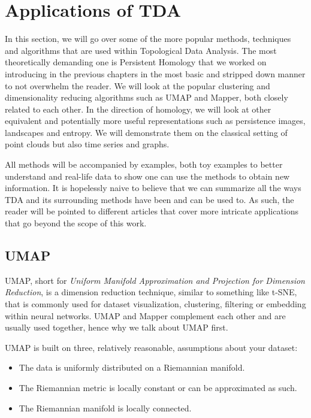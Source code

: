 \chapter{Applications of TDA}
\graphicspath{ {/home/tomasp/Dokumenty/Master_Thesis/figures/} }

In this section, we will go over some of the more popular methods, techniques and algorithms that are used within Topological Data Analysis. The most theoretically demanding one is Persistent Homology that we worked on introducing in the previous chapters in the most basic and stripped down manner to not overwhelm the reader. We will look at the popular clustering and dimensionality reducing algorithms such as UMAP and Mapper, both closely related to each other. In the direction of homology, we will look at other equivalent and potentially more useful representations such as persistence images, landscapes and entropy. We will demonstrate them on the classical setting of point clouds but also time series and graphs.

All methods will be accompanied by examples, both toy examples to better understand and real-life data to show one can use the methods to obtain new information. It is hopelessly naive to believe that we can summarize all the ways TDA and its surrounding methods have been and can be used to. As such, the reader will be pointed to different articles that cover more intricate applications that go beyond the scope of this work.

\section{UMAP}
UMAP, short for \textit{Uniform Manifold Approximation and Projection for Dimension Reduction}, is a dimension reduction technique, similar to something like t-SNE, that is commonly used for dataset visualization, clustering, filtering or embedding within neural networks. UMAP and Mapper complement each other and are usually used together, hence why we talk about UMAP first.

UMAP is built on three, relatively reasonable, assumptions about your dataset:
\begin{itemize}
  \item The data is uniformly distributed on a Riemannian manifold.
  \item The Riemannian metric is locally constant or can be approximated as such.
  \item The Riemannian manifold is locally connected.
\end{itemize}

